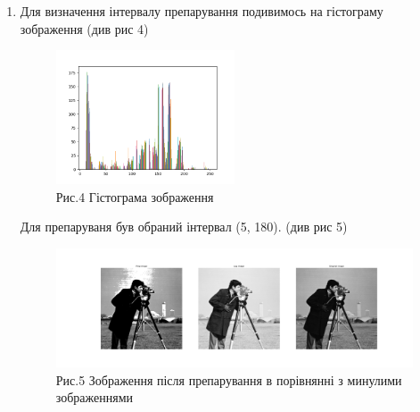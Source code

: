 \begin{enumerate}
    \item Для визначення інтервалу препарування подивимось на гістограму зображення 
    (див рис 4)
    \begin{figure}[h]
        \begin{center}
            \includegraphics[width=0.5\textwidth]{hist.png}
        \end{center}
        \caption*{Рис.4 Гістограма зображення}
    \end{figure}
    Для препаруваня був обраний інтервал (5, 180). (див рис 5)
    \begin{figure}[h]
        \begin{center}
            \includegraphics[width=\textwidth]{img_2.png}
        \end{center}
        \caption*{Рис.5 Зображення після препарування в порівнянні з минулими зображеннями}
    \end{figure}
\end{enumerate}
